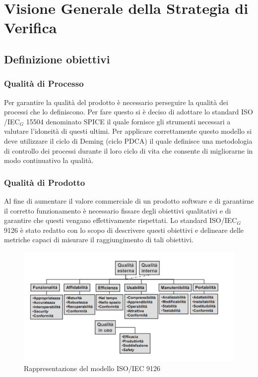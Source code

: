 \section{Visione Generale della Strategia di Verifica}

\subsection{Definizione obiettivi}

\subsubsection{Qualità di Processo}
Per garantire la qualità del prodotto è necessario perseguire la qualità dei processi che lo definiscono. Per fare questo si è deciso di adottare lo standard ISO /IEC$_G$ 15504 denominato SPICE il quale fornisce gli strumenti necessari a valutare l’idoneità di questi ultimi. Per applicare correttamente questo modello si deve utilizzare il ciclo di Deming (ciclo PDCA) il quale definisce una metodologia di controllo dei processi durante il loro ciclo di vita che consente di migliorarne in modo continuativo la qualità.

\subsubsection{Qualità di Prodotto}
Al fine di aumentare il valore commerciale di un prodotto software e di garantirne il corretto funzionamento è necessario fissare degli obiettivi qualitativi e di garantire che questi vengano effettivamente rispettati. Lo standard ISO/IEC$_G$ 9126 è stato redatto con lo scopo di descrivere questi obiettivi e delineare delle metriche capaci di misurare il raggiungimento di tali obiettivi.

\begin{figure}[h!]
	\centering
	\includegraphics[scale=.65]{img/9126.png}
	\caption{Rappresentazione del modello ISO/IEC 9126}
\end{figure}

